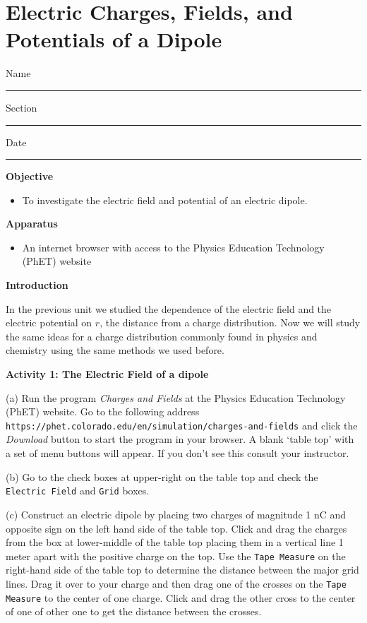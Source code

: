 
\section{Electric Charges, Fields, and Potentials of a Dipole}

Name \rule{2.0in}{0.1pt}\hfill{}Section \rule{1.0in}{0.1pt}\hfill{}Date
\rule{1.0in}{0.1pt}

\textbf{Objective}

\begin{itemize}
\item To investigate the electric field and potential of an electric dipole.
\end{itemize}

\textbf{Apparatus}

\begin{itemize}
\item An internet browser with access to the Physics Education Technology (PhET) website
\end{itemize}

\textbf{Introduction}

In the previous unit we studied the dependence
of the electric field and the electric potential on $r$, the distance from
a charge distribution.
Now we will study the same ideas for a charge distribution commonly found in physics and chemistry
using the same methods we used before.

\textbf{Activity 1: The Electric Field of a dipole}

(a) Run the program {\it Charges and Fields} at the Physics Education Technology (PhET)
website. Go to the following address {\tt https://phet.colorado.edu/en/simulation/charges-and-fields}
and click the {\it Download} button to start the program in your browser.
A blank `table top' with a set of menu buttons will appear. 
If you don't see this consult your instructor.

(b) Go to the check boxes at upper-right on the table top and check the {\tt Electric Field}
and {\tt Grid} boxes.

(c) Construct an electric dipole by placing two charges of magnitude 1 nC and opposite sign
on the left hand side of the table top.
Click and drag the charges 
from the box at lower-middle of the table top placing them in a vertical 
line 1 meter apart with the positive charge on the top. 
Use the {\tt Tape Measure} on the right-hand side of the table top
to determine the distance between the major grid lines.
Drag it over to your charge and then 
drag one of the crosses on the {\tt Tape Measure} to the center of one charge.
Click and drag the other cross to the center of one of other one to get
the distance between the crosses.

